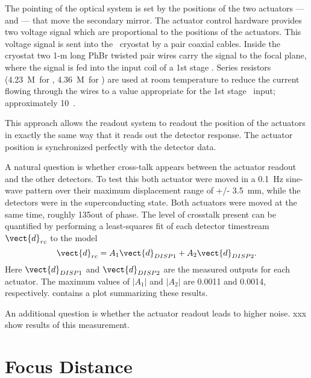 The pointing of the optical system is set by the positions of the two actuators ---  and  --- that move the secondary mirror.
The actuator control hardware provides two voltage signal which are proportional to the positions of the actuators.
This voltage signal is sent into the \Imager\ cryostat by a pair coaxial cables.
Inside the cryostat two 1-m long PhBr  twisted pair wires carry the signal to the focal plane, where the signal is fed into the input coil of a 1st stage \SQUID.
Series resistors (4.23~M\Ohm\ for , 4.36~M\Ohm\ for ) are used at room temperature to reduce the current flowing through the wires to a value appropriate for the 1st stage \SQUID\ input; approximately 10~\uA.

This approach allows the readout system to readout the position of the actuators in exactly the same way that it reads out the detector response.
The actuator position is synchronized perfectly with the detector data.

A natural question is whether cross-talk appears between the actuator readout and the other detectors.
To test this both actuator were moved in a 0.1~Hz sine-wave pattern over their maximum displacement range of +/- 3.5~mm, while the detectors were in the superconducting state.
Both actuators were moved at the same time, roughly 135\textdegree out of phase.
The level of crosstalk present can be quantified by performing a least-squares fit of each detector timestream $\vect{d}_{rc}$ to the model
\begin{equation}
	 \vect{d}_{rc} = A_1 \vect{d}_{\DISP1} + A_2 \vect{d}_{\DISP2}.
\end{equation}
Here $\vect{d}_{\DISP1}$ and $\vect{d}_{\DISP2}$ are the measured outputs for each actuator.
The maximum values of $|A_1|$  and $|A_2|$ are 0.0011 and 0.0014, respectively.
 contains a plot summarizing these results.

An additional question is whether the actuator readout leads to higher noise.
xxx show results of this measurement.


\section{Focus Distance}\label{s:focus-distance}

